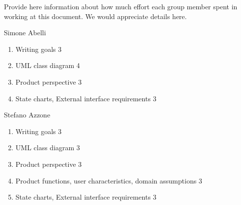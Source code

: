 Provide here information about how much effort each group member spent in working at this document. We would appreciate details here.

Simone Abelli
\begin{enumerate}
	\item Writing goals 3
	\item UML class diagram 4
	\item Product perspective 3
	\item State charts, External interface requirements 3
\end{enumerate}

Stefano Azzone
\begin{enumerate}
	\item Writing goals 3
	\item UML class diagram 3
	\item Product perspective 3
	\item Product functions, user characteristics, domain assumptions 3
	\item State charts, External interface requirements 3
\end{enumerate}